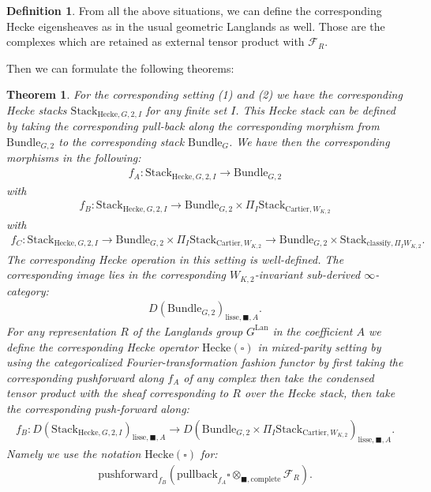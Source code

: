 \documentclass[12pt]{book}
\newtheorem{theorem}{Theorem}
\theoremstyle{definition}
\newtheorem{definition}{Definition}
\begin{document}
\begin{definition}
From all the above situations, we can define the corresponding Hecke eigensheaves as in the usual geometric Langlands as well. Those are the complexes which are retained as external tensor product with $\mathcal{F}_R$.
\end{definition}





\indent Then we can formulate the following theorems:
\begin{theorem}
For the corresponding setting (1) and (2) we have the corresponding Hecke stacks $\mathrm{Stack}_{\mathrm{Hecke},G,2,I}$ for any finite set $I$. This Hecke stack can be defined by taking the corresponding pull-back along the corresponding morphism from $\mathrm{Bundle}_{G,2}$ to the corresponding stack $\mathrm{Bundle}_{G}$. We have then the corresponding morphisms in the following:
\begin{align}
f_A: \mathrm{Stack}_{\mathrm{Hecke},G,2,I} \rightarrow \mathrm{Bundle}_{G,2}
\end{align}
with
\begin{align}
f_B: \mathrm{Stack}_{\mathrm{Hecke},G,2,I} \rightarrow \mathrm{Bundle}_{G,2}\times \Pi_I \mathrm{Stack}_{\mathrm{Cartier},W_{K,2}}
\end{align}
with
\begin{align}
f_C: \mathrm{Stack}_{\mathrm{Hecke},G,2,I} \rightarrow \mathrm{Bundle}_{G,2}\times\Pi_I  \mathrm{Stack}_{\mathrm{Cartier},W_{K,2}}\rightarrow \mathrm{Bundle}_{G,2}\times \mathrm{Stack}_{\mathrm{classify},\Pi_I W_{K,2}}.
\end{align}
The corresponding Hecke operation in this setting is well-defined. The corresponding image lies in the corresponding $W_{K,2}$-invariant sub-derived $\infty$-category:
\begin{align}
D(\mathrm{Bundle}_{G,2})_{\text{lisse},\blacksquare,A}.
\end{align}
For any representation $R$ of the Langlands group $G^\mathrm{Lan}$ in the coefficient $A$ we define the corresponding Hecke operator $\mathrm{Hecke}(\square)$ in mixed-parity setting by using the categoricalized Fourier-transformation fashion functor by first taking the corresponding pushforward along $f_A$ of any complex then take the condensed tensor product with the sheaf corresponding to $R$ over the Hecke stack, then take the corresponding push-forward along:
\begin{align}
f_B: D(\mathrm{Stack}_{\mathrm{Hecke},G,2,I})_{\text{lisse},\blacksquare,A} \rightarrow D(\mathrm{Bundle}_{G,2}\times \Pi_I \mathrm{Stack}_{\mathrm{Cartier},W_{K,2}})_{\text{lisse},\blacksquare,A}.
\end{align}
Namely we use the notation $\mathrm{Hecke}(\square)$ for:
\begin{align}
\mathrm{pushforward}_{f_B}(\mathrm{pullback}_{f_A}\square\otimes_{\blacksquare,\mathrm{complete}}\mathcal{F}_R).
\end{align}
\end{theorem}
\end{document}

